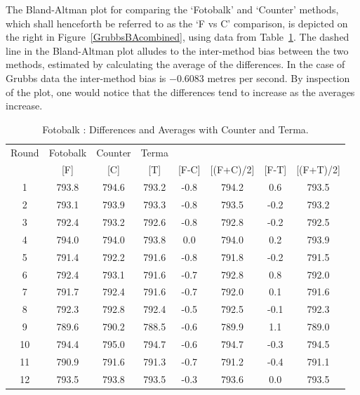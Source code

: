 \documentclass[12pt, a4paper]{report}
\theoremstyle{plain}
\theoremstyle{definition}
\theoremstyle{remark}
\begin{document}
The Bland-Altman plot for comparing the `Fotobalk' and `Counter' methods, which shall henceforth be referred to as the `F vs C' comparison, is depicted on the right in Figure~\ref{GrubbsBAcombined}, using data from Table~\ref{GrubbsData1}. The dashed line in the Bland-Altman plot alludes to the inter-method bias between the two methods, estimated by calculating the average of the differences. In the case of Grubbs data the inter-method bias is $-0.6083$ metres per second. By inspection of the plot, one would notice that the differences tend to increase as the averages increase.
		
	\begin{table}[h!]
		\renewcommand\arraystretch{0.7}%
		\begin{center}
			\begin{tabular}{|c||c|c|c||c|c|c|c|}
				\hline
				Round & Fotobalk  & Counter & Terma  &   &    &   &   \\
				&  [F] & [C] & [T] &[F-C] &  [(F+C)/2] & [F-T] &  [(F+T)/2] \\
				\hline
				1 & 793.8 & 794.6 & 793.2 & -0.8 & 794.2 & 0.6 & 793.5 \\
				2 & 793.1 & 793.9 & 793.3 & -0.8 & 793.5 & -0.2 & 793.2 \\
				3 & 792.4 & 793.2 & 792.6 & -0.8 & 792.8 & -0.2 & 792.5 \\
				4 & 794.0 & 794.0 & 793.8 & 0.0 & 794.0 & 0.2 & 793.9 \\
				5 & 791.4 & 792.2 & 791.6 & -0.8 & 791.8 & -0.2 & 791.5 \\
				6 & 792.4 & 793.1 & 791.6 & -0.7 & 792.8 & 0.8 & 792.0 \\
				7 & 791.7 & 792.4 & 791.6 & -0.7 & 792.0 & 0.1 & 791.6 \\
				8 & 792.3 & 792.8 & 792.4 & -0.5 & 792.5 & -0.1 & 792.3 \\
				9 & 789.6 & 790.2 & 788.5 & -0.6 & 789.9 & 1.1 & 789.0 \\
				10 & 794.4 & 795.0 & 794.7 & -0.6 & 794.7 & -0.3 & 794.5 \\
				11 & 790.9 & 791.6 & 791.3 & -0.7 & 791.2 & -0.4 & 791.1 \\
				12 & 793.5 & 793.8 & 793.5 & -0.3 & 793.6 & 0.0 & 793.5 \\
				\hline
			\end{tabular}
			\caption{Fotobalk : Differences and Averages with Counter and Terma.}
			\label{GrubbsData1}
		\end{center}
	\end{table}
\end{document}
